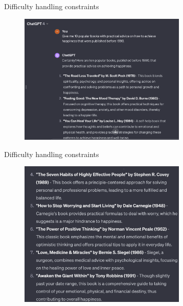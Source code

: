 \begin{vbframe}{Difficulty handling constraints}

\vfill

\begin{figure}
\centering
\includegraphics[width = 8cm]{figure/10happy1.png}
\end{figure}


\vfill

\end{vbframe}
\begin{vbframe}{Difficulty handling constraints}

\vfill

\begin{figure}
\centering
\includegraphics[width = 8cm]{figure/10happy2.png}
\end{figure}


\vfill

\end{vbframe}
